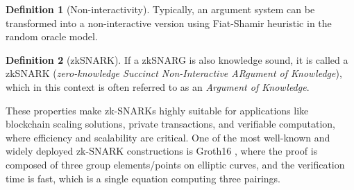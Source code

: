 \documentclass[12pt]{article}
\theoremstyle{definition}
\newtheorem{definition}{Definition}[section]
\begin{document}
\begin{definition}[Non-interactivity] Typically, an argument system can be transformed into a non-interactive version using Fiat-Shamir heuristic \cite{FS} in the random oracle model.  
\end{definition}

\begin{definition}[zkSNARK]If a zkSNARG is also knowledge sound, it is called a zkSNARK (\emph{zero-knowledge Succinct Non-Interactive ARgument of Knowledge}), which in this context is often referred to as an \emph{Argument of Knowledge}.
\end{definition}

These properties make zk-SNARKs highly suitable for applications like blockchain scaling solutions, private transactions, and verifiable computation, where efficiency and scalability are critical. One of the most well-known and widely deployed zk-SNARK constructions is Groth16 \cite{groth16}, where the proof is composed of three group elements/points on elliptic curves, and the verification time is fast, which is a single equation computing three pairings.

\printbibliography
\end{document}
